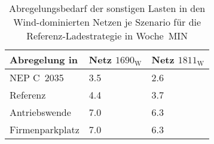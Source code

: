 {
\renewcommand{\arraystretch}{1.2}%
\begin{table}[H]
	\begin{center}
		\caption{Abregelungsbedarf der sonstigen Lasten in den Wind-dominierten Netzen je Szenario für die Referenz-Ladestrategie in Woche~MIN}
		\begin{tabu} to 0.6\textwidth {X[1.5] X[1, r] X[1, r]}
			\toprule
			Abregelung in   \si{\mwh}    & Netz \(1690_{\text{W}}\) & Netz \(1811_{\text{W}}\) \\ \midrule
			NEP C~\num{2035}             & \num{3.5}       & \num{2.6}       \\
			Referenz                     & \num{4.4}       & \num{3.7}       \\
			Antriebswende                & \num{7.0}       & \num{6.3}       \\
			\glqq Firmenparkplatz\grqq{} & \num{7.0}       & \num{6.3}       \\ \bottomrule
		\end{tabu}
		\label{tab:wind_dominated_week_a_load_cur}
	\end{center}
	\vspace{-3mm}%
\end{table}
}